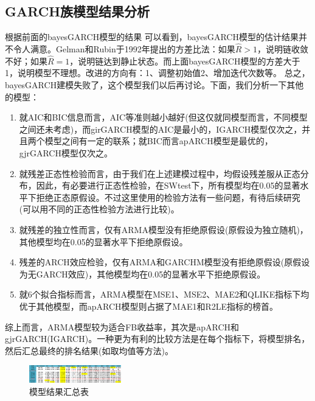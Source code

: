     \subsection{GARCH族模型结果分析}
        \par
        根据前面的bayesGARCH模型的结果
        可以看到，bayesGARCH模型的估计结果并不令人满意。Gelman和Rubin于1992年提出的方差比法：如果$\hat{R}>1$，说明链收敛不好；如果$\hat{R}=1$，说明链达到静止状态。而上面bayesGARCH模型的方差大于1，说明模型不理想。改进的方向有：1、调整初始值2、增加迭代次数等。
        总之，bayesGARCH建模失败了，这个模型我们以后再讨论。下面，我们分析一下其他的模型：
        \begin{enumerate}
        \item 就AIC和BIC信息而言，AIC等准则越小越好(但这仅就同模型而言，不同模型之间还未考虑)，而girGARCH模型的AIC是最小的，IGARCH模型仅次之，并且两个模型之间有一定的联系；就BIC而言apARCH模型是最优的，gjrGARCH模型仅次之。
        \item 就残差正态性检验而言，由于我们在上述建模过程中，均假设残差服从正态分布，因此，有必要进行正态性检验，在SWtest下，所有模型均在0.05的显著水平下拒绝正态原假设。不过这里使用的检验方法有一些问题，有待后续研究(可以用不同的正态性检验方法进行比较)。
        \item 就残差的独立性而言，仅有ARMA模型没有拒绝原假设(原假设为独立随机)，其他模型均在0.05的显著水平下拒绝原假设。
        \item 残差的ARCH效应检验，仅有ARMA和GARCHM模型没有拒绝原假设(原假设为无GARCH效应)，其他模型均在0.05的显著水平下拒绝原假设。
        \item 就6个拟合指标而言，ARMA模型在MSE1、MSE2、MAE2和QLIKE指标下均优于其他模型，而apARCH模型则占据了MAE1和R2LE指标的榜首。
        \end{enumerate}
        \par
        综上而言，ARMA模型较为适合FB收益率，其次是apARCH和gjrGARCH(IGARCH)。一种更为有利的比较方法是在每个指标下，将模型排名，然后汇总最终的排名结果(如取均值等方法)。
            \begin{figure}[H]
            \centering
            \includegraphics[angle=90,width=4cm]{images/model_result_summary.jpg}
            \caption{模型结果汇总表}
            \label{模型结果汇总表}
            \end{figure}
